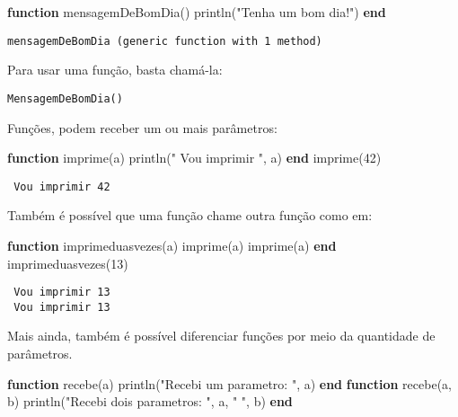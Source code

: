 \documentclass[
  letterpaper,
  DIV=11,
  numbers=noendperiod]{scrreprt}
\newenvironment{Shaded}{\begin{snugshade}}{\end{snugshade}}
\newcommand{\FloatTok}[1]{\textcolor[rgb]{0.68,0.00,0.00}{#1}}
\newcommand{\FunctionTok}[1]{\textcolor[rgb]{0.28,0.35,0.67}{#1}}
\newcommand{\KeywordTok}[1]{\textcolor[rgb]{0.00,0.23,0.31}{\textbf{#1}}}
\newcommand{\NormalTok}[1]{\textcolor[rgb]{0.00,0.23,0.31}{#1}}
\newcommand{\StringTok}[1]{\textcolor[rgb]{0.13,0.47,0.30}{#1}}
\begin{document}
\begin{Shaded}
\begin{Highlighting}[]
\KeywordTok{function} \FunctionTok{mensagemDeBomDia}\NormalTok{()}
   \FunctionTok{println}\NormalTok{(}\StringTok{"Tenha um bom dia!"}\NormalTok{)}
\KeywordTok{end}
\end{Highlighting}
\end{Shaded}

\begin{verbatim}
mensagemDeBomDia (generic function with 1 method)
\end{verbatim}

Para usar uma função, basta chamá-la:

\begin{verbatim}
MensagemDeBomDia()
\end{verbatim}

Funções, podem receber um ou mais parâmetros:

\begin{Shaded}
\begin{Highlighting}[]
\KeywordTok{function} \FunctionTok{imprime}\NormalTok{(a)}
   \FunctionTok{println}\NormalTok{(}\StringTok{" Vou imprimir "}\NormalTok{, a)}
\KeywordTok{end}
\FunctionTok{imprime}\NormalTok{(}\FloatTok{42}\NormalTok{)}
\end{Highlighting}
\end{Shaded}

\begin{verbatim}
 Vou imprimir 42
\end{verbatim}

Também é possível que uma função chame outra função como em:

\begin{Shaded}
\begin{Highlighting}[]
\KeywordTok{function} \FunctionTok{imprimeduasvezes}\NormalTok{(a)}
   \FunctionTok{imprime}\NormalTok{(a)}
   \FunctionTok{imprime}\NormalTok{(a)}
\KeywordTok{end}
\FunctionTok{imprimeduasvezes}\NormalTok{(}\FloatTok{13}\NormalTok{)}
\end{Highlighting}
\end{Shaded}

\begin{verbatim}
 Vou imprimir 13
 Vou imprimir 13
\end{verbatim}

Mais ainda, também é possível diferenciar funções por meio da quantidade
de parâmetros.

\begin{Shaded}
\begin{Highlighting}[]
\KeywordTok{function} \FunctionTok{recebe}\NormalTok{(a)}
  \FunctionTok{println}\NormalTok{(}\StringTok{"Recebi um parametro: "}\NormalTok{, a)}
\KeywordTok{end}
\KeywordTok{function} \FunctionTok{recebe}\NormalTok{(a, b)}
  \FunctionTok{println}\NormalTok{(}\StringTok{"Recebi dois parametros: "}\NormalTok{, a, }\StringTok{" "}\NormalTok{, b)}
\KeywordTok{end}
\end{Highlighting}
\end{Shaded}
\end{document}
